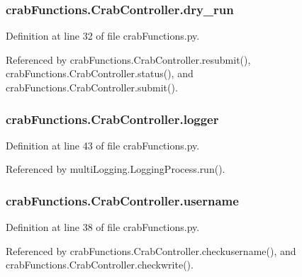 \subsubsection[{dry\-\_\-run}]{\setlength{\rightskip}{0pt plus 5cm}crab\-Functions.\-Crab\-Controller.\-dry\-\_\-run}\label{classcrabFunctions_1_1CrabController_a8e6640715c27f45e9a0c66c3efe0aa4d}


Definition at line 32 of file crab\-Functions.\-py.



Referenced by crab\-Functions.\-Crab\-Controller.\-resubmit(), crab\-Functions.\-Crab\-Controller.\-status(), and crab\-Functions.\-Crab\-Controller.\-submit().

\subsubsection[{logger}]{\setlength{\rightskip}{0pt plus 5cm}crab\-Functions.\-Crab\-Controller.\-logger}\label{classcrabFunctions_1_1CrabController_aeec5322c1cb1012abdde8ae71abd0f44}


Definition at line 43 of file crab\-Functions.\-py.



Referenced by multi\-Logging.\-Logging\-Process.\-run().

\subsubsection[{username}]{\setlength{\rightskip}{0pt plus 5cm}crab\-Functions.\-Crab\-Controller.\-username}\label{classcrabFunctions_1_1CrabController_a9e8b5ce5d1107334feed2e4bee2ba109}


Definition at line 38 of file crab\-Functions.\-py.



Referenced by crab\-Functions.\-Crab\-Controller.\-checkusername(), and crab\-Functions.\-Crab\-Controller.\-checkwrite().

